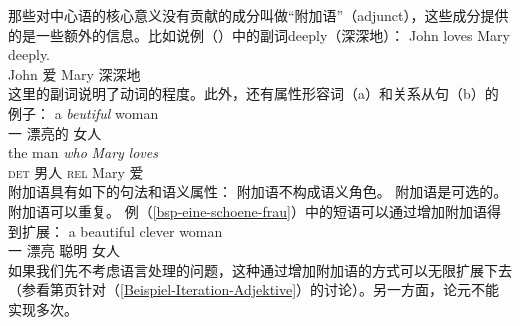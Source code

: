 那些对中心语的核心意义没有贡献的成分叫做“附加语”（adjunct），这些成分提供的是一些额外的信息。比如说例（）中的副词deeply（深深地）：
\ea
\gll John loves Mary deeply. \\
     John 爱 Mary 深深地 \\
\z
这里的副词说明了动词的程度。此外，还有属性形容词（a）和关系从句（b）的例子：
\eal
\ex\label{bsp-eine-schoene-frau}
\gll a {\em beutiful\/} woman\\
一 漂亮的 女人\\
\ex 
\gll the man {\em who\/} {\em Mary\/} {\em loves\/}\\
      \textsc{det}  男人 \textsc{rel} Mary  爱\\
\zl
附加语具有如下的句法和语义属性：
\eal
\label{adj-kriterien}
\ex 附加语不构成语义角色。
\ex 附加语是可选的。
\ex 附加语可以重复。
\zl
例（\ref{bsp-eine-schoene-frau}）中的短语可以通过增加附加语得到扩展：
\ea
\gll a beautiful clever woman \\
     一 漂亮 聪明 女人 \\
\z
如果我们先不考虑语言处理的问题，这种通过增加附加语的方式可以无限扩展下去（参看第\pageref{Beispiel-Iteration-Adjektive}页针对（\ref{Beispiel-Iteration-Adjektive}）的讨论）。另一方面，论元不能实现多次。
